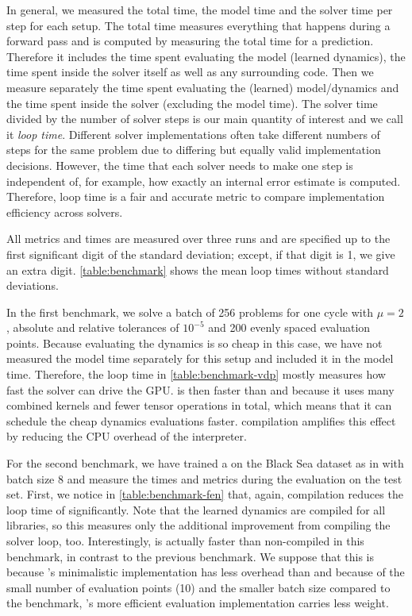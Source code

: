 \documentclass{article}
\begin{document}
In general, we measured the total time, the model time and the solver time per step for each setup. The total time measures everything that happens during a forward pass and is computed by measuring the total time for a prediction. Therefore it includes the time spent evaluating the model (learned dynamics), the time spent inside the solver itself as well as any surrounding code. Then we measure separately the time spent evaluating the (learned) model/dynamics and the time spent inside the \ODE{} solver (excluding the model time). The solver time divided by the number of solver steps is our main quantity of interest and we call it \emph{loop time}. Different solver implementations often take different numbers of steps for the same problem due to differing but equally valid implementation decisions. However, the time that each solver needs to make one step is independent of, for example, how exactly an internal error estimate is computed. Therefore, loop time is a fair and accurate metric to compare implementation efficiency across solvers.

All metrics and times are measured over three runs and are specified up to the first significant digit of the standard deviation; except, if that digit is \num{1}, we give an extra digit. \cref{table:benchmark} shows the mean loop times without standard deviations.

In the first benchmark, we solve a batch of \num{256} \vdp{} problems for one cycle with $\mu = 2$, absolute and relative tolerances of $10^{-5}$ and \num{200} evenly spaced evaluation points. Because evaluating the dynamics is so cheap in this case, we have not measured the model time separately for this setup and included it in the model time. Therefore, the loop time in \cref{table:benchmark-vdp} mostly measures how fast the solver can drive the GPU.\@ \torchode{} is then faster than \torchdiffeq{} and \torchdyn{} because it uses many combined \pytorch{} kernels and fewer tensor operations in total, which means that it can schedule the cheap dynamics evaluations faster. \jit{} compilation amplifies this effect by reducing the CPU overhead of the \python{} interpreter.

For the second benchmark, we have trained a \fen{} on the Black Sea dataset as in \citep{lienen2022learning} with batch size \num{8} and measure the times and metrics during the evaluation on the test set. First, we notice in \cref{table:benchmark-fen} that, again, \jit{} compilation reduces the loop time of \torchode{} significantly. Note that the learned dynamics are \jit{} compiled for all libraries, so this measures only the additional improvement from compiling the solver loop, too. Interestingly, \torchdyn{} is actually faster than non-compiled \torchode{} in this benchmark, in contrast to the previous benchmark. We suppose that this is because \torchdyn{}'s minimalistic implementation has less \python{} overhead than \torchode{} and because of the small number of evaluation points (\num{10}) and the smaller batch size compared to the \vdp{} benchmark, \torchode{}'s more efficient evaluation implementation carries less weight.
\end{document}
